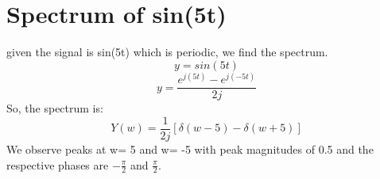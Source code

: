 \documentclass[11pt]{article}
\begin{document}
\section{Spectrum of sin(5t)}
given the signal is sin(5t) which is periodic, we find the spectrum.
\begin{equation}
    y = sin(5t)
\end{equation}
\begin{equation}
    y = \frac{e^{j(5t)} - e^{j(-5t)}}{2j}
\end{equation}
So, the spectrum is:
\begin{equation}
    Y(w) = \frac{1}{2j}[\delta (w-5) - \delta (w+5)]
\end{equation}
We observe peaks at w= 5 and w= -5 with peak magnitudes of 0.5 and the respective phases are $-\frac{\pi}{2}$ and $\frac{\pi}{2}$.
\end{document}
